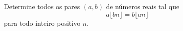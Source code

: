 Determine todos os pares $(a,b)$ de números reais tal que $$a \lfloor bn \rfloor =b \lfloor an \rfloor $$ para todo inteiro positivo $n$.

